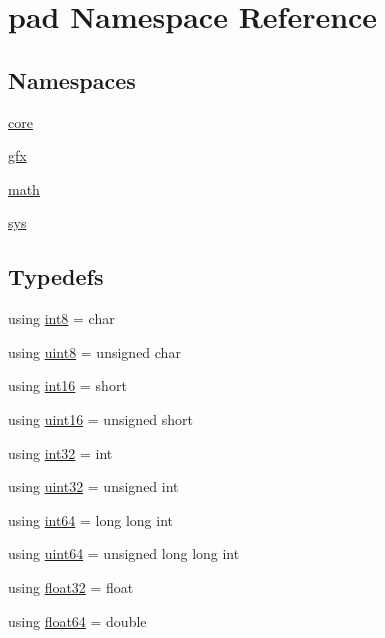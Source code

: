 \hypertarget{namespacepad}{}\section{pad Namespace Reference}
\label{namespacepad}
\subsection*{Namespaces}
\begin{DoxyCompactItemize}
\item 
 \mbox{\hyperlink{namespacepad_1_1core}{core}}
\item 
 \mbox{\hyperlink{namespacepad_1_1gfx}{gfx}}
\item 
 \mbox{\hyperlink{namespacepad_1_1math}{math}}
\item 
 \mbox{\hyperlink{namespacepad_1_1sys}{sys}}
\end{DoxyCompactItemize}
\subsection*{Typedefs}
\begin{DoxyCompactItemize}
\item 
using \mbox{\hyperlink{namespacepad_a9f598447cac2137f85ac7bb9322fe6be}{int8}} = char
\item 
using \mbox{\hyperlink{namespacepad_ac2d92bf238fe849ef0eab976bc6f6040}{uint8}} = unsigned char
\item 
using \mbox{\hyperlink{namespacepad_ab1a45c1f61489add8bf3a4c7a563d67a}{int16}} = short
\item 
using \mbox{\hyperlink{namespacepad_a03b9241a5f6a191da2faac64714e1038}{uint16}} = unsigned short
\item 
using \mbox{\hyperlink{namespacepad_a7faacd72761782d8adef66f2feba3c21}{int32}} = int
\item 
using \mbox{\hyperlink{namespacepad_a4101021f78334c7c461eef5b0b2eaa6f}{uint32}} = unsigned int
\item 
using \mbox{\hyperlink{namespacepad_a91b3934f581b6b83d2618e069a120fdd}{int64}} = long long int
\item 
using \mbox{\hyperlink{namespacepad_ae548145eb697683a147ccccabd88c77c}{uint64}} = unsigned long long int
\item 
using \mbox{\hyperlink{namespacepad_a0620ec4561a638bdbef1530ccf90fd4b}{float32}} = float
\item 
using \mbox{\hyperlink{namespacepad_a0b20ee3154cbe817a8d34c9e4b3b0508}{float64}} = double
\end{DoxyCompactItemize}


